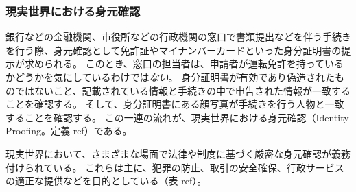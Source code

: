 \documentclass[uplatex]{jsarticle}
\def\ref#1{ref}%
\def\label#1{}%
\begin{document}
\subsubsection{現実世界における身元確認}

\begin{exa}[窓口での身分証明書による身元確認]\label{exa:ch2-counter-proofing}
銀行などの金融機関、市役所などの行政機関の窓口で書類提出などを伴う手続きを行う際、身元確認として免許証やマイナンバーカードといった身分証明書の提示が求められる。
このとき、窓口の担当者は、申請者が運転免許を持っているかどうかを気にしているわけでは\emph{ない}。
身分証明書が有効であり偽造されたものではないこと、記載されている情報と手続きの中で申告された情報が一致することを確認する。
そして、身分証明書にある顔写真が手続きを行う人物と一致することを確認する。
この一連の流れが、現実世界における身元確認（Identity Proofing。定義 \ref{dfn:identity-proofing}）である。
\end{exa}

現実世界において、さまざまな場面で法律や制度に基づく厳密な身元確認が義務付けられている。
これらは主に、犯罪の防止、取引の安全確保、行政サービスの適正な提供などを目的としている（表 \ref{tab:ch2-real-world-proofing}）。
\end{document}

